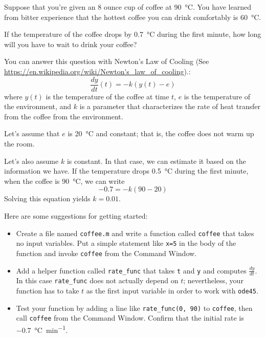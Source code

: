 \begin{ex}


Suppose that you're given an 8 ounce cup of coffee at \SI{90}{\celsius}.
You have learned from bitter experience that the hottest coffee you
can drink comfortably is \SI{60}{\celsius}.  

If the temperature of the coffee drops by \SI{0.7}{\celsius} during the first minute, how long will you have to wait to drink your coffee?

You can answer this question with Newton's Law of Cooling (See \url{https://en.wikipedia.org/wiki/Newton's_law_of_cooling}).:
%
\begin{equation*}
\frac{dy}{dt}(t) = -k (y(t) - e)
\end{equation*}
%
where $y(t)$ is the temperature of the coffee at time $t$,
$e$ is the temperature of the environment, and $k$ is a parameter
that characterizes the rate of heat transfer from the coffee from the environment.

Let's assume that $e$ is \SI{20}{\celsius} and constant; that is, the coffee does not warm up the room.

Let's also assume $k$ is constant.  In that case, we can estimate it based on the information we have.  If the temperature drops \SI{0.5}{\celsius} during the first minute, when the coffee is \SI{90}{\celsius}, we can write
%
\begin{equation*}
-0.7 = -k (90 - 20)
\end{equation*}
%
Solving this equation yields $k = 0.01$.

Here are some suggestions for getting started:

\begin{itemize}

\item Create a file named {\tt coffee.m} and write a function
called {\tt coffee} that takes no input variables.  Put a simple statement like {\tt x=5} in the body of the function and invoke {\tt coffee} from the Command Window.

\item Add a helper function called \verb"rate_func" that takes {\tt t} and {\tt y} and computes $\frac{dy}{dt}$.  In this case \verb"rate_func" does not actually depend on $t$; nevertheless, your function has to take $t$ as the first input variable in order to work with {\tt ode45}.

\item Test your function by adding a line like \verb"rate_func(0, 90)"
to {\tt coffee}, then call {\tt coffee} from the {\sf Command Window}.
Confirm that the initial rate is \SI{-0.7}{\celsius \per \minute}.


\end{itemize}
\end{ex}
